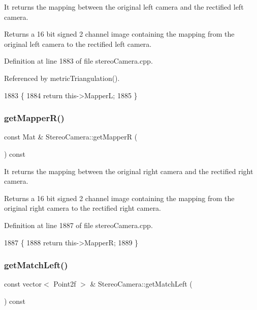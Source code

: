 It returns the mapping between the original left camera and the rectified left camera. 

\begin{DoxyReturn}{Returns}
a 16 bit signed 2 channel image containing the mapping from the original left camera to the rectified left camera. 
\end{DoxyReturn}


Definition at line 1883 of file stereo\+Camera.\+cpp.



Referenced by metric\+Triangulation().


\begin{DoxyCode}
1883                                           \{
1884     \textcolor{keywordflow}{return} this->MapperL;
1885 \}
\end{DoxyCode}
\mbox{\label{classStereoCamera_ac3f7763fdb6ed57f96924bb0b32b4ea7}} 
\subsubsection{\texorpdfstring{get\+Mapper\+R()}{getMapperR()}}
{\footnotesize\ttfamily const Mat \& Stereo\+Camera\+::get\+MapperR (\begin{DoxyParamCaption}{ }\end{DoxyParamCaption}) const}



It returns the mapping between the original right camera and the rectified right camera. 

\begin{DoxyReturn}{Returns}
a 16 bit signed 2 channel image containing the mapping from the original right camera to the rectified right camera. 
\end{DoxyReturn}


Definition at line 1887 of file stereo\+Camera.\+cpp.


\begin{DoxyCode}
1887                                           \{
1888     \textcolor{keywordflow}{return} this->MapperR;
1889 \}
\end{DoxyCode}
\mbox{\label{classStereoCamera_aa50cb648f92d099e1ffbb7bab57c3fc3}} 
\subsubsection{\texorpdfstring{get\+Match\+Left()}{getMatchLeft()}}
{\footnotesize\ttfamily const vector$<$ Point2f $>$ \& Stereo\+Camera\+::get\+Match\+Left (\begin{DoxyParamCaption}{ }\end{DoxyParamCaption}) const}



